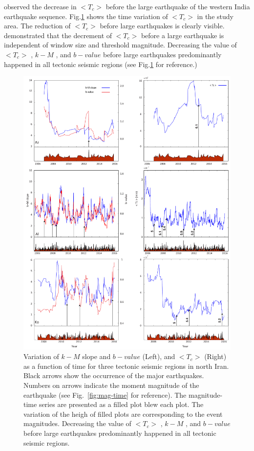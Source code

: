 \citet{Telesca2016}  observed the decrease in  $<T_c>$  before the large earthquake of the western India earthquake sequence. Fig.\ref{fig:tc}  shows the time variation of  $<T_c>$   in the study area. The reduction of  $<T_c>$   before large earthquakes is clearly visible.  \citet{Telesca2016}  demonstrated that the decrement of  $<T_c>$   before a large earthquake is independent of window size and threshold magnitude. Decreasing the value of  $<T_c>$  ,  $k-M$ , and  $b-value$  before large earthquakes predominantly happened in all tectonic seismic regions (see Fig.\ref{fig:tc} for reference.)
 
\begin{figure}[t]
	\centering
	\includegraphics[scale=0.4]{figures/pdf/Figure10.pdf} 
	\caption{ Variation of $k-M$ slope  and $b-value$ (Left), and $ < T_c >$ (Right) as a function of time for three tectonic seismic regions in north Iran. Black arrows show the occurrence of the major earthquakes. Numbers on arrows indicate the moment magnitude of the earthquake (see Fig.~\ref{fig:mag-time} for reference).  The magnitude-time series are presented as a filled plot blew each plot. The variation of the heigh of filled plots are corresponding to the event magnitudes. Decreasing the value of  $<T_c>$  ,  $k-M$ , and  $b-value$  before large earthquakes predominantly happened in all tectonic seismic regions.}
	\label{fig:tc}
\end{figure}
